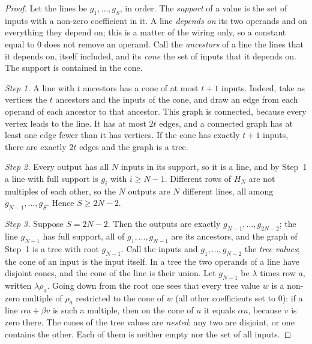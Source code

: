 \documentclass[10pt]{article}
\theoremstyle{remark}
\begin{document}
\begin{proof}
Let the lines be $g_1,\dots,g_S$, in order. The \emph{support} of a value is the set of inputs with a non-zero
coefficient in it. A line \emph{depends on} its two operands and on everything they depend on; this is a matter
of the wiring only, so a constant equal to $0$ does not remove an operand. Call the \emph{ancestors} of a
line the lines that it depends on, itself included, and its \emph{cone} the set of inputs that it depends
on.
The support is contained in the cone.

\emph{Step 1.} A line with $t$ ancestors has a cone of at most $t+1$ inputs. Indeed, take as vertices the
$t$ ancestors and the inputs of the cone, and draw an edge from each operand of each ancestor to that
ancestor. This graph is connected, because every vertex leads to the line. It has at most $2t$ edges, and a
connected graph has at least one edge fewer than it has vertices. If the cone has exactly $t+1$ inputs, there
are exactly $2t$ edges and the graph is a tree.

\emph{Step 2.} Every output has all $N$ inputs in its support, so it is a line, and by Step~1 a line with full
support is $g_i$ with $i\ge N-1$. Different rows of $H_N$ are not multiples of each other, so the $N$ outputs
are $N$ different lines, all among $g_{N-1},\dots,g_S$. Hence $S\ge 2N-2$.

\emph{Step 3.} Suppose $S=2N-2$. Then the outputs are exactly $g_{N-1},\dots,g_{2N-2}$; the line $g_{N-1}$ has
full support, all of $g_1,\dots,g_{N-1}$ are its ancestors, and the graph of Step~1 is a tree with root
$g_{N-1}$. Call the inputs and $g_1,\dots,g_{N-2}$ the \emph{tree values}; the cone of an input is the input itself. In a tree the two operands of a line
have disjoint cones, and the cone of the line is their union. Let $g_{N-1}$ be $\lambda$ times row $a$,
written $\lambda\rho_a$. Going down from the root one sees that every tree value $w$ is a non-zero multiple
of $\rho_a$ restricted to the cone of $w$ (all other coefficients set to $0$): if a line $\alpha u+\beta v$ is
such a multiple, then on the cone of $u$ it equals $\alpha u$, because $v$ is zero there. The cones of the
tree values are \emph{nested}: any two are disjoint, or one contains the other. Each of them is neither
empty nor the set of all inputs.


\end{proof}
\end{document}
